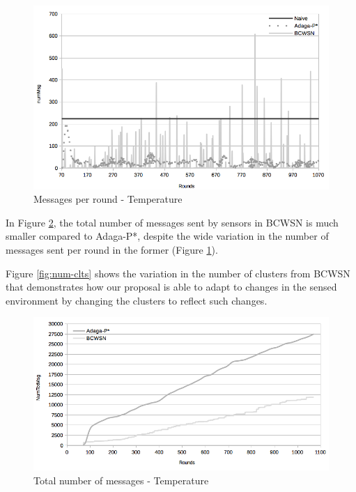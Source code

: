\documentclass{acm_proc_article-sp}
\begin{document}
\begin{figure}[!htb]
\begin{center}
	\includegraphics[scale=0.28]{BCWSN-NumMsgPerRoundxRound-PB-Temp.png}
	 \vspace*{-.6cm}
    \caption{Messages per round - Temperature}

    \label{fig:num-msg}
\end{center}
\end{figure}
\vspace*{-.6cm}

In Figure \ref{fig:tot-num-msg}, the total number of messages sent by sensors in
BCWSN is much smaller compared to Adaga-P*, despite the wide variation in the
number of messages sent per round in the former (Figure \ref{fig:num-msg}).
\vspace*{-.3cm}

Figure \ref{fig:num-clts} shows the variation in the number of clusters from
BCWSN that demonstrates how our proposal is able to adapt to changes in the
sensed environment by changing the clusters to reflect such changes.

\begin{figure}[!htb]
\begin{center}
	\includegraphics[scale=0.30]{BCWSN-TotNumMsgxRound-PB-Temp.png}
	 \vspace*{-.6cm}
    \caption{Total number of messages - Temperature}
    \label{fig:tot-num-msg}
\end{center}
\end{figure}
\vspace*{-.3cm}
\end{document}
